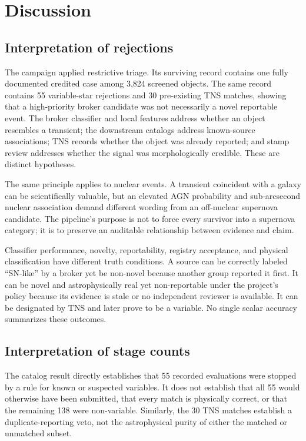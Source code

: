 \documentclass[11pt]{article}
\begin{document}
\section{Discussion}
\label{sec:discussion}

\subsection{Interpretation of rejections}

The campaign applied restrictive triage. Its surviving record contains one fully documented credited case among 3,824 screened objects. The same record contains 55 variable-star rejections and 30 pre-existing TNS matches, showing that a high-priority broker candidate was not necessarily a novel reportable event. The broker classifier and local features address whether an object resembles a transient; the downstream catalogs address known-source associations; TNS records whether the object was already reported; and stamp review addresses whether the signal was morphologically credible. These are distinct hypotheses.

The same principle applies to nuclear events. A transient coincident with a galaxy can be scientifically valuable, but an elevated AGN probability and sub-arcsecond nuclear association demand different wording from an off-nuclear supernova candidate. The pipeline's purpose is not to force every survivor into a supernova category; it is to preserve an auditable relationship between evidence and claim.

Classifier performance, novelty, reportability, registry acceptance, and physical classification have different truth conditions. A source can be correctly labeled ``SN-like'' by a broker yet be non-novel because another group reported it first. It can be novel and astrophysically real yet non-reportable under the project's policy because its evidence is stale or no independent reviewer is available. It can be designated by TNS and later prove to be a variable. No single scalar accuracy summarizes these outcomes.

\subsection{Interpretation of stage counts}

The catalog result directly establishes that 55 recorded evaluations were stopped by a rule for known or suspected variables. It does not establish that all 55 would otherwise have been submitted, that every match is physically correct, or that the remaining 138 were non-variable. Similarly, the 30 TNS matches establish a duplicate-reporting veto, not the astrophysical purity of either the matched or unmatched subset.
\end{document}
